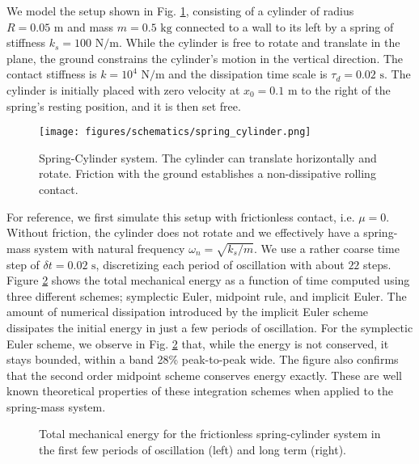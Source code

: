 We model the setup shown in Fig. \ref{fig:spring_cylinder}, consisting of a
cylinder of radius $R=0.05\text{ m}$ and mass $m=0.5\text{ kg}$ connected to a
wall to its left by a spring of stiffness $k_s=100\text{ N}/\text{m}$. While the
cylinder is free to rotate and translate in the plane, the ground constrains the
cylinder's motion in the vertical direction. The contact stiffness is
$k=10^{4}\text{ N}/\text{m}$ and the dissipation time scale is
$\tau_d=0.02\text{ s}$. The cylinder is initially placed with zero velocity at
$x_0=0.1\text{ m}$ to the right of the spring's resting position, and it is then
set free.
\begin{figure}[!h]
	\centering
	\texttt{[image: figures/schematics/spring\_cylinder.png]}
	\caption{\label{fig:spring_cylinder} 
	Spring-Cylinder system. The cylinder can translate horizontally and rotate.
	Friction with the ground establishes a non-dissipative rolling contact.}
\end{figure}

For reference, we first simulate this setup with frictionless contact, i.e.
$\mu=0$. Without friction, the cylinder does not rotate and we effectively have
a spring-mass system with natural frequency $\omega_n=\sqrt{k_s/m}$. We use a
rather coarse time step of $\delta t=0.02\text{ s}$, discretizing each period of
oscillation with about $22$ steps. Figure
\ref{fig:frictionless_spring_cylinder_energy} shows the total mechanical energy
as a function of time computed using three different schemes; symplectic Euler,
midpoint rule, and implicit Euler. The amount of numerical dissipation
introduced by the implicit Euler scheme dissipates the initial energy in just a
few periods of oscillation. For the symplectic Euler scheme, we observe in Fig.
\ref{fig:frictionless_spring_cylinder_energy} that, while the energy is not
conserved, it stays bounded, within a band 28\% peak-to-peak wide. The figure
also confirms that the second order midpoint scheme conserves energy exactly.
These are well known theoretical properties of these integration schemes when
applied to the spring-mass system.
\begin{figure}[!h]
    \centering
    \caption{\label{fig:frictionless_spring_cylinder_energy} 
    Total mechanical energy for the frictionless spring-cylinder system in the
    first few periods of oscillation (left) and long term (right).}
\end{figure}

